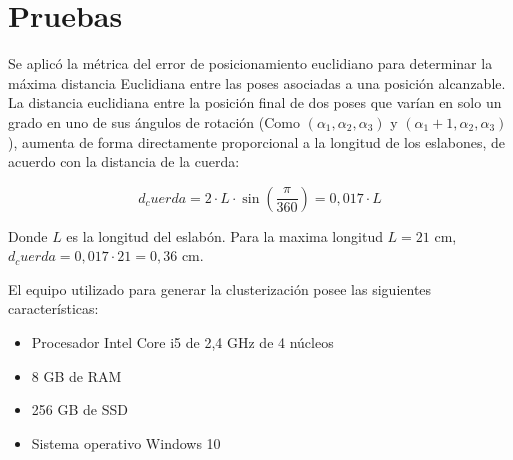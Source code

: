 \section{Pruebas}

Se aplicó la métrica del error de posicionamiento euclidiano para determinar la máxima distancia Euclidiana entre las poses asociadas a una posición alcanzable. La distancia euclidiana entre la posición final de dos poses que varían en solo un grado en uno de sus ángulos de rotación (Como $(\alpha_1,\alpha_2,\alpha_3)$ y $(\alpha_1 + 1, \alpha_2, \alpha_3)$), aumenta de forma directamente proporcional a la longitud de los eslabones, de acuerdo con la distancia de la cuerda:

\begin{equation}
	d_cuerda = 2 \cdot L \cdot \sin(\frac{\pi}{360}) = 0,017 \cdot L
\end{equation}

Donde $L$ es la longitud del eslabón. Para la maxima longitud $L = 21$ cm, $d_cuerda = 0,017 \cdot 21 = 0,36$ cm.

El equipo utilizado para generar la clusterización posee las siguientes características:

\begin{itemize}
	\item Procesador Intel Core i5 de 2,4 GHz de 4 núcleos
	\item 8 GB de RAM
	\item 256 GB de SSD
	\item Sistema operativo Windows 10
\end{itemize}

